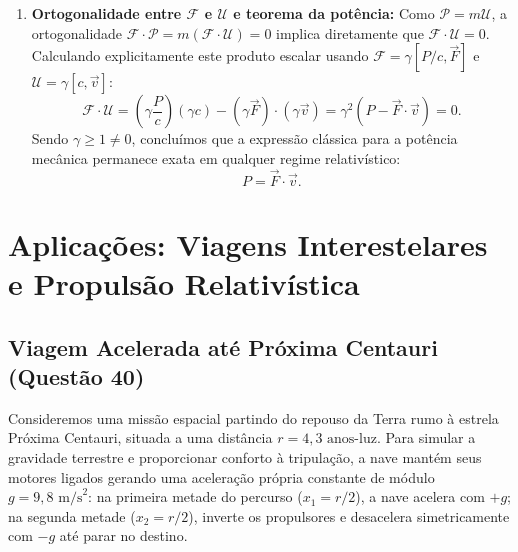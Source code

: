 \documentclass[11pt, a4paper]{article}
\begin{document}
\begin{enumerate}[label=\alph*)]
    \item \textbf{Ortogonalidade entre $\mathcal{F}$ e $\mathcal{U}$ e teorema da potência:} Como $\mathcal{P} = m\mathcal{U}$, a ortogonalidade $\mathcal{F} \cdot \mathcal{P} = m (\mathcal{F} \cdot \mathcal{U}) = 0$ implica diretamente que $\mathcal{F} \cdot \mathcal{U} = 0$. Calculando explicitamente este produto escalar usando $\mathcal{F} = \gamma [P/c, \vec{F}]$ e $\mathcal{U} = \gamma [c, \vec{v}]$:
    \begin{equation}
    \mathcal{F} \cdot \mathcal{U} = \left( \gamma \frac{P}{c} \right) (\gamma c) - (\gamma \vec{F}) \cdot (\gamma \vec{v}) = \gamma^2 (P - \vec{F} \cdot \vec{v}) = 0.
    \end{equation}
    Sendo $\gamma \ge 1 \neq 0$, concluímos que a expressão clássica para a potência mecânica permanece exata em qualquer regime relativístico:
    \begin{equation}
    P = \vec{F} \cdot \vec{v}.
    \end{equation}
\end{enumerate}

\section{Aplicações: Viagens Interestelares e Propulsão Relativística}

\subsection{Viagem Acelerada até Próxima Centauri (Questão 40)}

Consideremos uma missão espacial partindo do repouso da Terra rumo à estrela Próxima Centauri, situada a uma distância $r = 4{,}3\text{ anos-luz}$. Para simular a gravidade terrestre e proporcionar conforto à tripulação, a nave mantém seus motores ligados gerando uma aceleração própria constante de módulo $g = 9{,}8\text{ m/s}^2$: na primeira metade do percurso ($x_1 = r/2$), a nave acelera com $+g$; na segunda metade ($x_2 = r/2$), inverte os propulsores e desacelera simetricamente com $-g$ até parar no destino.
\end{document}
